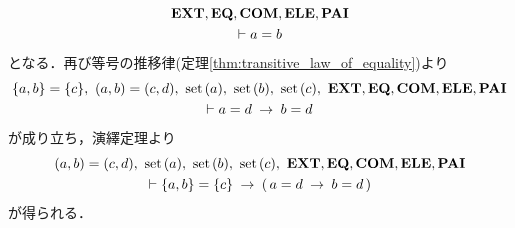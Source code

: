 \begin{sketch}
\begin{description}
\begin{align}
\begin{gathered}
						\mbox{{\bf EXT}},\mbox{{\bf EQ}},\mbox{\bf COM},\mbox{{\bf ELE}}, \mbox{{\bf PAI}} \\
						\vdash a = b
					\end{gathered}
				\end{align}
				となる．再び等号の推移律(定理\ref{thm:transitive_law_of_equality})より
				\begin{align}
					\begin{gathered}
						\{a,b\} = \{c\},\ (a,b) = (c,d),\ \set{a},\ \set{b},\ \set{c},\ 
						\EXTAX,\EQAX,\COMAX,\ELEAX,\PAIAX \\
						\vdash a = d \rarrow b = d
					\end{gathered}
					\label{fom:equality_of_ordered_pairs_7}
				\end{align}
				が成り立ち，演繹定理より
				\begin{align}
					\begin{gathered}
						(a,b) = (c,d),\ \set{a},\ \set{b},\ \set{c},\ 
						\EXTAX,\EQAX,\COMAX,\ELEAX,\PAIAX \\ 
						\vdash \{a,b\} = \{c\} \rarrow (\, a = d \rarrow b = d\, )
					\end{gathered}
					\label{fom:equality_of_ordered_pairs_9}
				\end{align}
				が得られる．
				

\end{description}
\end{sketch}
